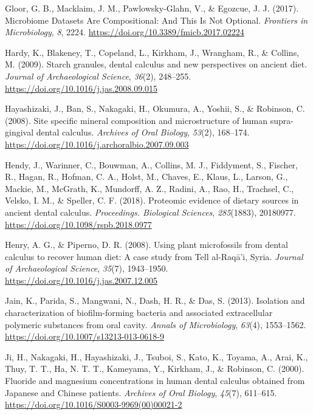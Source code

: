 \documentclass[
  b5paper,
]{book}
\newlength{\cslhangindent}
\newenvironment{CSLReferences}[2] %
 {\begin{list}{}{%
  \setlength{\itemindent}{0pt}
  \setlength{\leftmargin}{0pt}
  \setlength{\parsep}{0pt}
  \ifodd #1
   \setlength{\leftmargin}{\cslhangindent}
   \setlength{\itemindent}{-1\cslhangindent}
  \fi
  \setlength{\itemsep}{#2\baselineskip}}}
 {\end{list}}
\begin{document}
\begin{CSLReferences}{1}{0}
Gloor, G. B., Macklaim, J. M., Pawlowsky-Glahn, V., \& Egozcue, J. J.
(2017). Microbiome {Datasets Are Compositional}: {And This Is Not
Optional}. \emph{Frontiers in Microbiology}, \emph{8}, 2224.
\url{https://doi.org/10.3389/fmicb.2017.02224}

Hardy, K., Blakeney, T., Copeland, L., Kirkham, J., Wrangham, R., \&
Collins, M. (2009). Starch granules, dental calculus and new
perspectives on ancient diet. \emph{Journal of Archaeological Science},
\emph{36}(2), 248--255. \url{https://doi.org/10.1016/j.jas.2008.09.015}

Hayashizaki, J., Ban, S., Nakagaki, H., Okumura, A., Yoshii, S., \&
Robinson, C. (2008). Site specific mineral composition and
microstructure of human supra-gingival dental calculus. \emph{Archives
of Oral Biology}, \emph{53}(2), 168--174.
\url{https://doi.org/10.1016/j.archoralbio.2007.09.003}

Hendy, J., Warinner, C., Bouwman, A., Collins, M. J., Fiddyment, S.,
Fischer, R., Hagan, R., Hofman, C. A., Holst, M., Chaves, E., Klaus, L.,
Larson, G., Mackie, M., McGrath, K., Mundorff, A. Z., Radini, A., Rao,
H., Trachsel, C., Velsko, I. M., \& Speller, C. F. (2018). Proteomic
evidence of dietary sources in ancient dental calculus.
\emph{Proceedings. Biological Sciences}, \emph{285}(1883), 20180977.
\url{https://doi.org/10.1098/rspb.2018.0977}

Henry, A. G., \& Piperno, D. R. (2008). Using plant microfossils from
dental calculus to recover human diet: A case study from {Tell}
al-{Raqā}'i, {Syria}. \emph{Journal of Archaeological Science},
\emph{35}(7), 1943--1950.
\url{https://doi.org/10.1016/j.jas.2007.12.005}

Jain, K., Parida, S., Mangwani, N., Dash, H. R., \& Das, S. (2013).
Isolation and characterization of biofilm-forming bacteria and
associated extracellular polymeric substances from oral cavity.
\emph{Annals of Microbiology}, \emph{63}(4), 1553--1562.
\url{https://doi.org/10.1007/s13213-013-0618-9}

Ji, H., Nakagaki, H., Hayashizaki, J., Tsuboi, S., Kato, K., Toyama, A.,
Arai, K., Thuy, T. T., Ha, N. T. T., Kameyama, Y., Kirkham, J., \&
Robinson, C. (2000). Fluoride and magnesium concentrations in human
dental calculus obtained from {Japanese} and {Chinese} patients.
\emph{Archives of Oral Biology}, \emph{45}(7), 611--615.
\url{https://doi.org/10.1016/S0003-9969(00)00021-2}


\end{CSLReferences}
\end{document}

